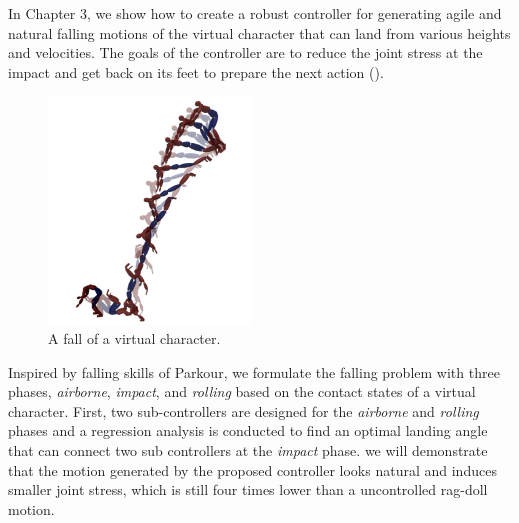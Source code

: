 In Chapter 3, we show how to create a robust controller for generating 
agile and natural falling motions of the virtual character that can land from 
various heights and velocities.
The goals of the controller are to reduce the joint stress at the impact and
get back on its feet to prepare the next action ().

\begin{figure}
 \vspace{-25pt}
  \begin{center}
    \includegraphics[width=0.48\textwidth]{images/intro_falling_sequence.png}
  \end{center}
   \vspace{-25pt}
  \caption{A fall of a virtual character.}
  \label{fig:intro_landing}
   \vspace{-10pt}
\end{figure}

Inspired by falling skills of Parkour, 
we formulate the falling problem
with three phases, \emph{airborne}, \emph{impact}, and \emph{rolling}
based on the contact states of a virtual character.
First, two sub-controllers are designed for the \emph{airborne} and
\emph{rolling} phases and a regression analysis is conducted to find 
an optimal landing angle that can connect two sub controllers at the
\emph{impact} phase.
we will demonstrate that the motion generated by the proposed controller
looks natural and induces smaller joint stress, which is still four times lower
than a uncontrolled rag-doll motion.


